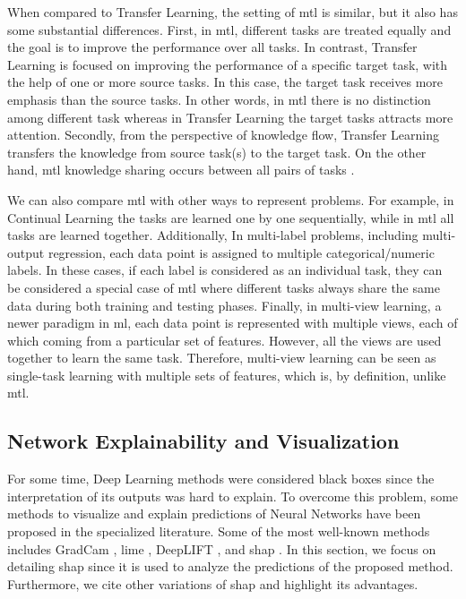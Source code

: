 When compared to Transfer Learning, the setting of \acs{mtl} is similar, but it also has some substantial differences. First, in \acs{mtl}, different tasks are treated equally and the goal is to improve the performance over all tasks. In contrast, Transfer Learning is focused on improving the performance of a specific target task, with the help of one or more source tasks. In this case, the target task receives more emphasis than the source tasks. In other words, in \acs{mtl} there is no distinction among different task whereas in Transfer Learning the target tasks attracts more attention. Secondly, from the perspective of knowledge flow, Transfer Learning transfers the knowledge from source task(s) to the target task. On the other hand, \acl{mtl} knowledge sharing occurs between all pairs of tasks \cite{zhang2017survey}.

We can also compare \acs{mtl} with other ways to represent problems. For example, in Continual Learning the tasks are learned one by one sequentially, while in \acs{mtl} all tasks are learned together. Additionally, In multi-label problems, including multi-output regression, each data point is assigned to multiple categorical/numeric labels. In these cases, if each label is considered as an individual task, they can be considered a special case of \acl{mtl} where different tasks always share the same data during both training and testing phases. Finally, in multi-view learning, a newer paradigm in \acl{ml}, each data point is represented with multiple views, each of which coming from a particular set of features. However, all the views are used together to learn the same task. Therefore, multi-view learning can be seen as single-task learning with multiple sets of features, which is, by definition, unlike \acs{mtl}.

\subsection{Network Explainability and Visualization}

For some time, Deep Learning methods were considered black boxes since the interpretation of its outputs was hard to explain. To overcome this problem, some methods to visualize and explain predictions of Neural Networks have been proposed in the specialized literature. Some of the most well-known methods includes GradCam \citep{gradcam}, \acf{lime} \citep{lime}, DeepLIFT \citep{deeplift_old, deeplift_new}, and \acs{shap} \citep{shap2018}. In this section, we focus on detailing \acs{shap} since it is used to analyze the predictions of the proposed method. Furthermore, we cite other variations of \acs{shap} and highlight its advantages.

